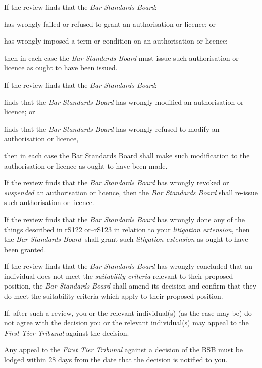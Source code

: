 
If the review finds that the \emph{Bar Standards Board}:\nl\item has wrongly failed or refused to grant an authorisation or licence;
or
\item has wrongly imposed a term or condition on an authorisation or
licence;

then in each case the \emph{Bar Standards Board} must issue such
authorisation or licence as ought to have been issued.
\ln
{}

If the review finds that the \emph{Bar Standards Board}:\nl\item finds that the \emph{Bar Standards Board} has wrongly modified an
authorisation or licence; or
\item finds that the \emph{Bar Standards Board} has wrongly refused to
modify an authorisation or licence,

then in each case the Bar Standards Board shall make such modification
to the authorisation or licence as ought to have been made.
\ln
{}

If the review finds that the \emph{Bar Standards Board} has wrongly
revoked or \emph{suspended} an authorisation or licence, then the
\emph{Bar Standards Board} shall re-issue such authorisation or licence.\nl\item If the review finds that the \emph{Bar Standards Board} has wrongly
done any of the things described in rS122 or--rS123 in relation to your
\emph{litigation extension}, then the \emph{Bar Standards Board~}shall
grant such \emph{litigation extension} as ought to have been granted.
\ln
{}

If the review finds that the \emph{Bar Standards Board} has wrongly
concluded that an individual does not meet the \emph{suitability
criteria} relevant to their proposed position, the \emph{Bar Standards
Board} shall amend its decision and confirm that they do meet the
suitability criteria which apply to their proposed position.


If, after such a review, you or the relevant individual(s) (as the case
may be) do not agree with the decision you or the relevant individual(s)
may appeal to the \emph{First Tier Tribunal} against the decision.


Any appeal to the \emph{First Tier Tribunal} against a decision of the
BSB must be lodged within 28 days from the date that the decision is
notified to you.

